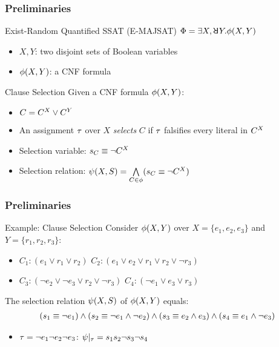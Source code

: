 \begin{frame}
  \frametitle{Preliminaries}
  \begin{block}{Exist-Random Quantified SSAT (E-MAJSAT)}
    $\Qf=\exists X,\random{} Y.\pf(X,Y)$
    \pause
    \begin{itemize}
      \item $X,Y$: two disjoint sets of Boolean variables
            \pause
      \item $\phi(X,Y)$: a CNF formula
            \pause
    \end{itemize}
  \end{block}
  \begin{block}{Clause Selection}
    Given a CNF formula $\phi(X,Y)$:
    \pause
    \begin{itemize}
      \item $C=C^X\lor C^Y$
            \pause
      \item An assignment $\tau$ over $X$ \textit{selects} $C$ if $\tau$ falsifies every literal in $C^X$
            \pause
      \item Selection variable: $s_{C}\equiv\lnot C^X$
            \pause
      \item Selection relation: $\psi(X,S)=\bigwedge\limits_{C\in\phi}(s_{C}\equiv\lnot C^X)$
    \end{itemize}
  \end{block}
\end{frame}

\begin{frame}
  \frametitle{Preliminaries}
  \begin{block}{Example: Clause Selection}
    Consider $\phi(X,Y)$ over $X=\{e_1,e_2,e_3\}$ and $Y=\{r_1,r_2,r_3\}$:
    \begin{itemize}
      \item[] $C_1: (e_1 \lor r_1 \lor r_2)$ $C_2: (e_1 \lor e_2 \lor r_1 \lor r_2 \lor \lnot r_3)$
      \item[] $C_3: (\lnot e_2 \lor \lnot e_3 \lor r_2 \lor \lnot r_3)$ $C_4: (\lnot e_1 \lor e_3 \lor r_3)$
    \end{itemize}
    \pause
    The selection relation $\psi(X,S)$ of $\phi(X,Y)$ equals:
    \belowdisplayskip=0pt
    \begin{align*}
      (s_{1} \equiv \lnot e_1) \land
      (s_{2} \equiv \lnot e_1 \land \lnot e_2) \land
      (s_{3} \equiv e_2 \land e_3) \land
      (s_{4} \equiv e_1 \land \lnot e_3)
    \end{align*}
    \pause
    \begin{itemize}
      \item $\tau=\lnot e_1 \lnot e_2 \lnot e_3$: $\psi|_{\tau}=s_1s_2\neg s_3 \neg s_4$
    \end{itemize}
  \end{block}
\end{frame}
